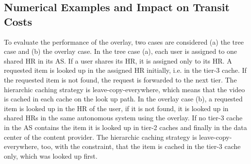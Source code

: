 \subsection{Numerical Examples and Impact on Transit Costs}\label{sec:hierarchical:simulative:evaluation}

To evaluate the performance of the overlay, two cases are considered (a) the tree case and (b) the overlay case. In the tree case (a), each user is assigned to one shared HR in its AS. If a user shares its HR, it is assigned only to its HR. A requested item is looked up in the assigned HR initially, i.e. in the tier-3 cache. If the requested item is not found, the request is forwarded to the next tier. The hierarchic caching strategy is leave-copy-everywhere, which means that the video is cached in each cache on the look up path. In the overlay case (b), a requested item is looked up in the HR of the user, if it is not found, it is looked up in shared HRs in the same autonomous system using the overlay. If no tier-3 cache in the AS contains the item it is looked up in tier-2 caches and finally in the data center of the content provider. The hierarchic caching strategy is leave-copy-everywhere, too, with the constraint, that the item is cached in the tier-3 cache only, which was looked up first.

